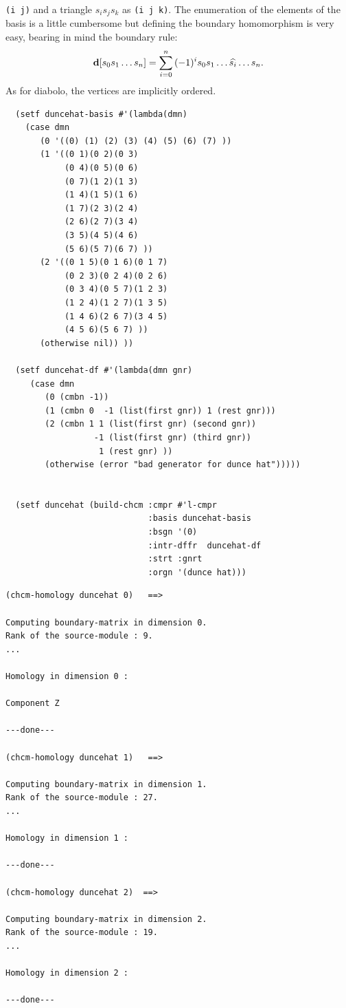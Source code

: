 {\tt (i j)} and a triangle $s_is_js_k$ as {\tt (i j k)}. The enumeration of
the elements of the basis is a little  cumbersome but defining  the
boundary homomorphism is very easy, bearing in mind the boundary rule:
$$ {\bf d}[s_0s_1\ldots s_n] = \sum_{i=0}^n{(-1)^is_0s_1\ldots\widehat{s_i}\ldots s_n}.$$
As for diabolo, the vertices are  implicitly ordered.
{\footnotesize\begin{verbatim}
  (setf duncehat-basis #'(lambda(dmn)
    (case dmn
       (0 '((0) (1) (2) (3) (4) (5) (6) (7) ))
       (1 '((0 1)(0 2)(0 3)
            (0 4)(0 5)(0 6)
            (0 7)(1 2)(1 3)
            (1 4)(1 5)(1 6)
            (1 7)(2 3)(2 4)
            (2 6)(2 7)(3 4)
            (3 5)(4 5)(4 6)
            (5 6)(5 7)(6 7) ))
       (2 '((0 1 5)(0 1 6)(0 1 7)
            (0 2 3)(0 2 4)(0 2 6)
            (0 3 4)(0 5 7)(1 2 3)
            (1 2 4)(1 2 7)(1 3 5)
            (1 4 6)(2 6 7)(3 4 5)
            (4 5 6)(5 6 7) ))
       (otherwise nil)) ))

  (setf duncehat-df #'(lambda(dmn gnr)
     (case dmn
        (0 (cmbn -1))
        (1 (cmbn 0  -1 (list(first gnr)) 1 (rest gnr)))
        (2 (cmbn 1 1 (list(first gnr) (second gnr))
                  -1 (list(first gnr) (third gnr))
                   1 (rest gnr) ))
        (otherwise (error "bad generator for dunce hat")))))


  (setf duncehat (build-chcm :cmpr #'l-cmpr
                             :basis duncehat-basis
                             :bsgn '(0)
                             :intr-dffr  duncehat-df
                             :strt :gnrt
                             :orgn '(dunce hat)))
\end{verbatim}}
\newpage
{\footnotesize\begin{verbatim}
(chcm-homology duncehat 0)   ==>

Computing boundary-matrix in dimension 0.
Rank of the source-module : 9.
...

Homology in dimension 0 :

Component Z

---done---

(chcm-homology duncehat 1)   ==>

Computing boundary-matrix in dimension 1.
Rank of the source-module : 27.
...

Homology in dimension 1 :

---done---

(chcm-homology duncehat 2)  ==>

Computing boundary-matrix in dimension 2.
Rank of the source-module : 19.
...

Homology in dimension 2 :

---done---
\end{verbatim}}

